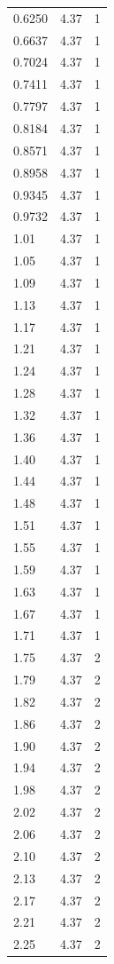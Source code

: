 \begin{longtable}{lrr}
  0.6250 & 4.37 & 1 \\
  0.6637 & 4.37 & 1 \\
  0.7024 & 4.37 & 1 \\
  0.7411 & 4.37 & 1 \\
  0.7797 & 4.37 & 1 \\
  0.8184 & 4.37 & 1 \\
  0.8571 & 4.37 & 1 \\
  0.8958 & 4.37 & 1 \\
  0.9345 & 4.37 & 1 \\
  0.9732 & 4.37 & 1 \\
  1.01 & 4.37 & 1 \\
  1.05 & 4.37 & 1 \\
  1.09 & 4.37 & 1 \\
  1.13 & 4.37 & 1 \\
  1.17 & 4.37 & 1 \\
  1.21 & 4.37 & 1 \\
  1.24 & 4.37 & 1 \\
  1.28 & 4.37 & 1 \\
  1.32 & 4.37 & 1 \\
  1.36 & 4.37 & 1 \\
  1.40 & 4.37 & 1 \\
  1.44 & 4.37 & 1 \\
  1.48 & 4.37 & 1 \\
  1.51 & 4.37 & 1 \\
  1.55 & 4.37 & 1 \\
  1.59 & 4.37 & 1 \\
  1.63 & 4.37 & 1 \\
  1.67 & 4.37 & 1 \\
  1.71 & 4.37 & 1 \\
  1.75 & 4.37 & 2 \\
  1.79 & 4.37 & 2 \\
  1.82 & 4.37 & 2 \\
  1.86 & 4.37 & 2 \\
  1.90 & 4.37 & 2 \\
  1.94 & 4.37 & 2 \\
  1.98 & 4.37 & 2 \\
  2.02 & 4.37 & 2 \\
  2.06 & 4.37 & 2 \\
  2.10 & 4.37 & 2 \\
  2.13 & 4.37 & 2 \\
  2.17 & 4.37 & 2 \\
  2.21 & 4.37 & 2 \\
  2.25 & 4.37 & 2 \\

\end{longtable}
